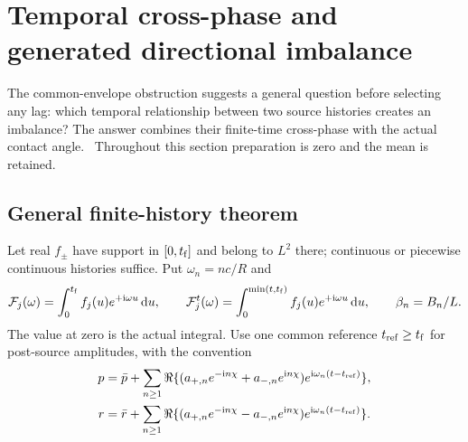 \section{Temporal cross-phase and generated directional imbalance}\label{sec:timing}
The common-envelope obstruction suggests a general question before selecting any lag: which temporal relationship between two source histories creates an imbalance? The answer combines their finite-time cross-phase with the actual contact angle.~\cite{SRG08} Throughout this section preparation is zero and the mean is retained.

\subsection{General finite-history theorem}
Let real $f_\pm$ have support in $[0,t_{\mathrm f}]$ and belong to $L^2$ there; continuous or piecewise continuous histories suffice. Put $\omega_n=nc/R$ and
\begin{equation}\label{eq:finiteF}
 \mathcal F_j(\omega)=\int_0^{t_{\mathrm f}}f_j(u)e^{+\mathrm i\omega u}\,\mathrm d u,\qquad
 \mathcal F_j^t(\omega)=\int_0^{\min(t,t_{\mathrm f})}f_j(u)e^{+\mathrm i\omega u}\,\mathrm d u,
 \qquad\beta_n=B_n/L.
\end{equation}
The value at zero is the actual integral. Use one common reference $t_{\mathrm{ref}}\ge t_{\mathrm f}$ for post-source amplitudes, with the convention
\begin{equation}\label{eq:generalexpansion}
 \begin{aligned}
 p&=\bar p+\sum_{n\ge1}\Re\{(a_{+,n}e^{-\mathrm i n\chi}+a_{-,n}e^{\mathrm i n\chi})e^{\mathrm i\omega_n(t-t_{\mathrm{ref}})}\},\\
 r&=\bar r+\sum_{n\ge1}\Re\{(a_{+,n}e^{-\mathrm i n\chi}-a_{-,n}e^{\mathrm i n\chi})e^{\mathrm i\omega_n(t-t_{\mathrm{ref}})}\}.
 \end{aligned}
\end{equation}


